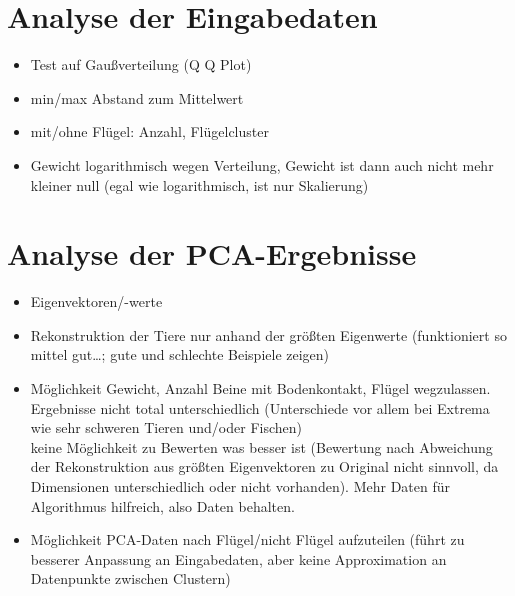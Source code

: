  \section{Analyse der Eingabedaten}
 
 
 \begin{itemize}
  \item Test auf Gaußverteilung (Q Q Plot) 
  \item min/max Abstand zum Mittelwert
  \item mit/ohne Flügel: Anzahl, Flügelcluster
  \item Gewicht logarithmisch wegen Verteilung, Gewicht ist dann auch nicht mehr kleiner null (egal wie logarithmisch, ist nur Skalierung)
 \end{itemize}
 
 
 \section{Analyse der PCA-Ergebnisse}

 \begin{itemize}
  \item Eigenvektoren/-werte
  \item Rekonstruktion der Tiere nur anhand der größten Eigenwerte (funktioniert so mittel gut\dots; gute und schlechte Beispiele zeigen)
  \item Möglichkeit Gewicht, Anzahl Beine mit Bodenkontakt, Flügel wegzulassen. Ergebnisse nicht total unterschiedlich (Unterschiede vor allem bei Extrema wie sehr schweren Tieren und/oder Fischen)\\
  keine Möglichkeit zu Bewerten was besser ist (Bewertung nach Abweichung der Rekonstruktion aus größten Eigenvektoren zu Original nicht sinnvoll, da Dimensionen unterschiedlich oder nicht vorhanden). Mehr Daten für Algorithmus hilfreich, also Daten behalten.
  \item Möglichkeit PCA-Daten nach Flügel/nicht Flügel aufzuteilen (führt zu besserer Anpassung an Eingabedaten, aber keine Approximation an Datenpunkte zwischen Clustern) 
 \end{itemize}
 


